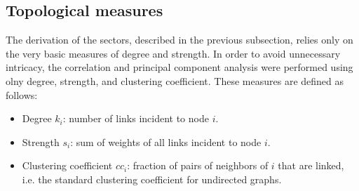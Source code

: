 \documentclass[review]{elsarticle}
\begin{document}
\subsection{Topological measures}\label{smes}
The derivation of the sectors, described in the previous subsection,
relies only on the very basic measures of degree and strength.
In order to avoid unnecessary intricacy,
the correlation and principal component analysis
were performed using olny degree, strength, and clustering coefficient.
These measures are defined as follows:
\begin{itemize}
\item Degree $k_i$: number of links incident to node $i$.
\item Strength $s_i$: sum of weights of all links incident to node $i$.
\item Clustering coefficient $cc_i$:
  fraction of pairs of neighbors of $i$ that are linked, i.e. the standard clustering coefficient for undirected graphs.
\end{itemize}
\end{document}
